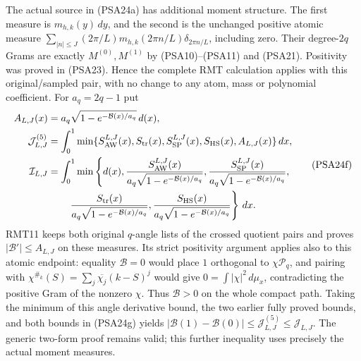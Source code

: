 The actual source in (PSA24a) has additional moment structure.
The first measure is $m_{h,k}(y)\,dy$, and the second is the
unchanged positive atomic measure
$\sum_{|n|\le J}(2\pi/L)m_{h,k}(2\pi n/L)\delta_{2\pi n/L}$,
including zero. Their degree-$2q$ Grams are exactly
$M^{(0)},M^{(1)}$ by (PSA10)--(PSA11) and (PSA21).
Positivity was proved in (PSA23). Hence the complete RMT
calculation applies with this original/sampled pair, with no
change to any atom, mass or polynomial coefficient.
For $a_q=2q-1$ put
\[
 \begin{aligned}
 A_{L,J}(x)&=a_q\sqrt{1-e^{-\mathcal B(x)/a_q}}\,d(x),\\
 \mathcal J^{(5)}_{L,J}&=\int_0^1
 \min\{S_{\rm AW}^{L,J}(x),S_{\rm tr}(x),S_{\rm SP}^{L,J}(x),S_{\rm HS}(x),A_{L,J}(x)\}\,dx,\\
 \mathcal I_{L,J}&=\int_0^1\min\left\{d(x),
 \frac{S_{\rm AW}^{L,J}(x)}{a_q\sqrt{1-e^{-\mathcal B(x)/a_q}}},
 \frac{S_{\rm SP}^{L,J}(x)}{a_q\sqrt{1-e^{-\mathcal B(x)/a_q}}},\right.
 \\
 &\hspace{2em}\left. \frac{S_{\rm tr}(x)}{a_q\sqrt{1-e^{-\mathcal B(x)/a_q}}},
 \frac{S_{\rm HS}(x)}{a_q\sqrt{1-e^{-\mathcal B(x)/a_q}}}\right\}\,dx.
 \end{aligned}
 \tag{PSA24f}
\]
RMT11 keeps both original $q$-angle lists of the crossed quotient
pairs and proves $|\mathcal B'|\le A_{L,J}$ on these measures.
Its strict positivity argument applies also to this atomic
endpoint: equality $\mathcal B=0$ would place $1$ orthogonal to
$\chi\mathcal P_q$, and pairing with
$\chi^{\#_k}(S)=\sum_j\overline{\chi_j}(k-S)^j$ would give
$0=\int|\chi|^2\,d\mu_x$, contradicting the positive Gram of
the nonzero $\chi$. Thus $\mathcal B>0$ on the whole compact path.
Taking the minimum of this angle derivative bound, the two earlier
fully proved bounds, and both bounds in (PSA24g) yields
$|\mathcal B(1)-\mathcal B(0)|\le\mathcal J^{(5)}_{L,J}
\le\mathcal J_{L,J}$. The generic two-form proof remains valid;
this further inequality uses precisely the actual moment measures.

